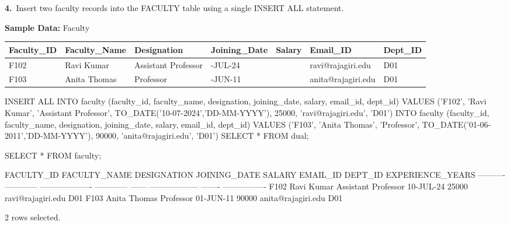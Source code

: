 \noindent\begin{minipage}{\linewidth}
\begingroup{}
{\fontsize{14}{17}\selectfont\textbf{4.}}\ Insert two faculty records into the FACULTY table using a single INSERT ALL statement.\par
\endgroup\vspace{12pt}

\noindent\textbf{Sample Data:} Faculty\par
\vspace{6pt}
{\small\setlength{\tabcolsep}{4pt}
\renewcommand{\arraystretch}{1.25}
\noindent\begin{tabular}{|>{\raggedright\arraybackslash}p{56.4pt}|>{\raggedright\arraybackslash}p{71.7pt}|>{\raggedright\arraybackslash}p{87.9pt}|>{\raggedright\arraybackslash}p{65.6pt}|>{\raggedleft\arraybackslash}p{33.8pt}|>{\raggedright\arraybackslash}p{85.1pt}|>{\raggedright\arraybackslash}p{43.6pt}|}
\hline
\textbf{Faculty\_ID} & \textbf{Faculty\_Name} & \textbf{Designation} & \textbf{Joining\_Date} & \textbf{Salary} & \textbf{Email\_ID} & \textbf{Dept\_ID} \\ \hline
F102 & Ravi Kumar & Assistant Professor & 10-JUL-24 & 25000 & ravi@rajagiri.edu & D01 \\ \hline
F103 & Anita Thomas & Professor & 01-JUN-11 & 90000 & anita@rajagiri.edu & D01 \\ \hline
\end{tabular}\par}
\vspace{14pt}

\begin{sqlcode}[fontsize=\footnotesize]
INSERT ALL
  INTO faculty (faculty_id, faculty_name, designation, joining_date, salary,
                email_id, dept_id)
  VALUES ('F102', 'Ravi Kumar', 'Assistant Professor', TO_DATE('10-07-2024','DD-MM-YYYY'),
          25000, 'ravi@rajagiri.edu', 'D01')
  INTO faculty (faculty_id, faculty_name, designation, joining_date, salary,
                email_id, dept_id)
  VALUES ('F103', 'Anita Thomas', 'Professor', TO_DATE('01-06-2011','DD-MM-YYYY'),
          90000, 'anita@rajagiri.edu', 'D01')
SELECT * FROM dual;

SELECT * FROM faculty;
\end{sqlcode}

\vspace{18pt}


\begin{sqlout}[fontsize=\scriptsize]
FACULTY_ID  FACULTY_NAME  DESIGNATION          JOINING_DATE  SALARY  EMAIL_ID            DEPT_ID  EXPERIENCE_YEARS
----------  ------------  -------------------  ------------  ------  ------------------  -------  ----------------
F102        Ravi Kumar    Assistant Professor  10-JUL-24      25000  ravi@rajagiri.edu   D01
F103        Anita Thomas  Professor            01-JUN-11      90000  anita@rajagiri.edu  D01

2 rows selected.
\end{sqlout}
\end{minipage}\par\vspace{24pt}

